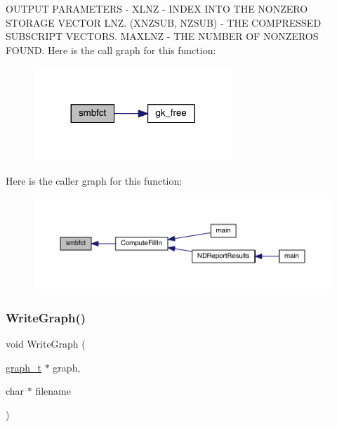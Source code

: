 O\+U\+T\+P\+UT P\+A\+R\+A\+M\+E\+T\+E\+RS -\/ X\+L\+NZ -\/ I\+N\+D\+EX I\+N\+TO T\+HE N\+O\+N\+Z\+E\+RO S\+T\+O\+R\+A\+GE V\+E\+C\+T\+OR L\+NZ. (X\+N\+Z\+S\+UB, N\+Z\+S\+UB) -\/ T\+HE C\+O\+M\+P\+R\+E\+S\+S\+ED S\+U\+B\+S\+C\+R\+I\+PT V\+E\+C\+T\+O\+RS. M\+A\+X\+L\+NZ -\/ T\+HE N\+U\+M\+B\+ER OF N\+O\+N\+Z\+E\+R\+OS F\+O\+U\+ND. Here is the call graph for this function\+:\nopagebreak
\begin{figure}[H]
\begin{center}
\leavevmode
\includegraphics[width=212pt]{a00948_a4c231449fdf45c79d8d5107ad63b3451_cgraph}
\end{center}
\end{figure}
Here is the caller graph for this function\+:\nopagebreak
\begin{figure}[H]
\begin{center}
\leavevmode
\includegraphics[width=350pt]{a00948_a4c231449fdf45c79d8d5107ad63b3451_icgraph}
\end{center}
\end{figure}
\mbox{\label{a00948_a91b3b24f2b508da8f2e2df7bc2c94cc6}} 
\subsubsection{\texorpdfstring{Write\+Graph()}{WriteGraph()}}
{\footnotesize\ttfamily void Write\+Graph (\begin{DoxyParamCaption}\item[{\hyperlink{a00734}{graph\+\_\+t} $\ast$}]{graph,  }\item[{char $\ast$}]{filename }\end{DoxyParamCaption})}

